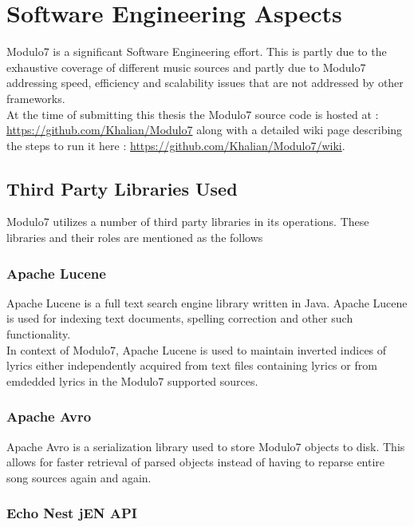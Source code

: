 \appendix
{}
\chapter{Software Engineering Aspects}

\noindent Modulo7 is a significant Software Engineering effort. This is partly due to the exhaustive coverage of different music sources and partly due to Modulo7 addressing speed, efficiency and scalability issues that are not addressed by other frameworks. \\

\noindent At the time of submitting this thesis the Modulo7 source code is hosted at : \\ \url{https://github.com/Khalian/Modulo7} along with a detailed wiki page describing the steps to run it here : \url{https://github.com/Khalian/Modulo7/wiki}. 

\section{Third Party Libraries Used}

\noindent Modulo7 utilizes a number of third party libraries in its operations. These libraries and their roles are mentioned as the follows

\subsection{Apache Lucene}

\noindent Apache Lucene is a full text search engine library written in Java. Apache Lucene is used for indexing text documents, spelling correction and other such functionality. \\
In context of Modulo7, Apache Lucene is used to maintain inverted indices of lyrics either independently acquired from text files containing lyrics or from emdedded lyrics in the Modulo7 supported sources. 

\subsection{Apache Avro}

\noindent Apache Avro is a serialization library used to store Modulo7 objects to disk. This allows for faster retrieval of parsed objects instead of having to reparse entire song sources again and again.

\subsection{Echo Nest jEN API}

